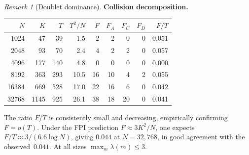 \documentclass[11pt]{article}
\theoremstyle{definition}
\theoremstyle{remark}
\newtheorem{remark}[theorem]{Remark}
\begin{document}
\begin{remark}[Doublet dominance]
\medskip
\noindent\textbf{Collision decomposition.}

\smallskip
\begin{center}
\begin{tabular}{rrrrrrrrr}
\toprule
$N$ & $K$ & $T$ & $T^2/N$ & $F$ & $F_A$ & $F_C$ & $F_D$ & $F/T$ \\
\midrule
1024 & 47 & 39 & 1.5 & 2 & 2 & 0 & 0 & 0.051 \\
2048 & 93 & 70 & 2.4 & 4 & 2 & 2 & 0 & 0.057 \\
4096 & 177 & 140 & 4.8 & 0 & 0 & 0 & 0 & 0.000 \\
8192 & 363 & 293 & 10.5 & 16 & 10 & 4 & 2 & 0.055 \\
16384 & 669 & 528 & 17.0 & 22 & 16 & 6 & 0 & 0.042 \\
32768 & 1145 & 925 & 26.1 & 38 & 18 & 20 & 0 & 0.041 \\
\bottomrule
\end{tabular}
\end{center}
\smallskip
\noindent
The ratio $F/T$ is consistently small and
decreasing, empirically confirming $F = o(T)$.
Under the FPI prediction
$F \approx 3K^2/N$, one expects
$F/T \approx 3/(6.6\log N)$,
giving $0.044$ at $N = 32{,}768$,
in good agreement with the observed~$0.041$.
At all sizes $\max_m\lambda(m) \le 3$.
\end{remark}
\end{document}
